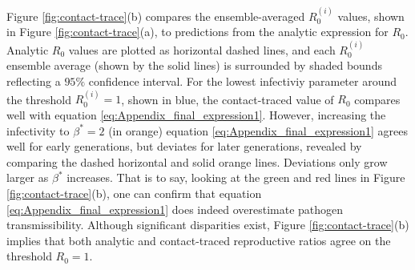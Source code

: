 Figure \ref{fig:contact-trace}(b) compares the ensemble-averaged $R^{(i)}_0$ values, shown in Figure \ref{fig:contact-trace}(a),
to predictions from the analytic expression for $R_0$.
Analytic $R_0$ values are plotted as horizontal dashed lines, and each $R_0^{(i)}$ ensemble average (shown by the solid lines) is surrounded by shaded bounds reflecting a $95\%$ confidence interval.
For the lowest infectiviy parameter around the threshold $R^{(i)}_0=1$, shown in blue, the contact-traced value of $R_0$ compares well with equation \ref{eq:Appendix_final_expression1}.
However, increasing the infectivity to $\beta^*=2$ (in orange) equation \ref{eq:Appendix_final_expression1} agrees well for early generations, but deviates for later generations, 
revealed by comparing the dashed horizontal and solid orange lines.
Deviations only grow larger as $\beta^*$ increases.
That is to say, looking at the green and red lines in Figure \ref{fig:contact-trace}(b), one can confirm that equation \ref{eq:Appendix_final_expression1} does indeed overestimate pathogen transmissibility.
Although significant disparities exist, Figure \ref{fig:contact-trace}(b) implies that both analytic and contact-traced reproductive ratios agree on the threshold $R_0=1$.

